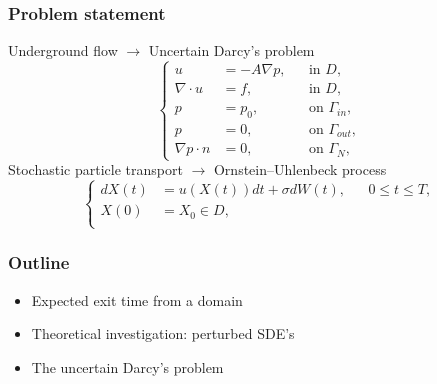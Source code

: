 \begin{frame}[plain]
\frametitle{Problem statement}
Underground flow $\rightarrow$ Uncertain Darcy's problem
\begin{equation*}
	\left \{
  	\begin{aligned}
		u &= -A \nabla p, && \text{in } D, \\
		\nabla\cdot u &= f, && \text{in } D, \\
		p &= p_0, && \text{on } \Gamma_{in},\\
		p &= 0, && \text{on } \Gamma_{out}, \\
		\nabla p \cdot n &= 0, && \text{on } \Gamma_N,
	\end{aligned} \right.
\end{equation*}
Stochastic particle transport $\rightarrow$ Ornstein–Uhlenbeck process
\begin{equation*}
	\left \{
	\begin{aligned}
		dX(t) &= u(X(t)) dt + \sigma dW(t), && 0 \leq t \leq T, \\
		X(0) &= X_0 \in D, \\
	\end{aligned} \right.
\end{equation*}
\end{frame}

\begin{frame}[plain]
\frametitle{Outline}
\begin{itemize}
	\item Expected exit time from a domain
	\item Theoretical investigation: perturbed SDE's 
	\item The uncertain Darcy's problem 
\end{itemize}
\end{frame}
